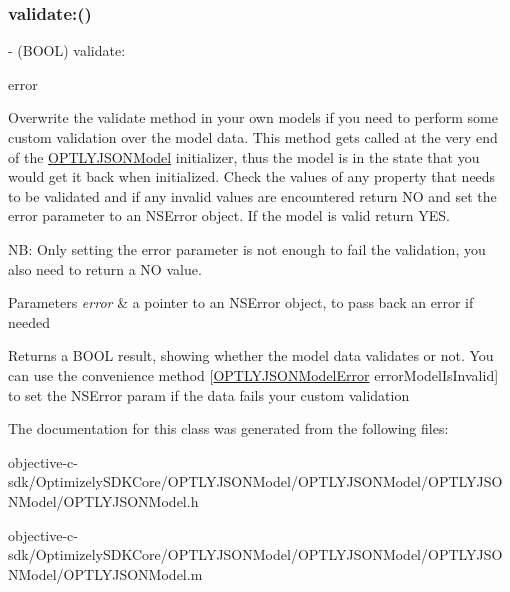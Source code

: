 \subsubsection{\texorpdfstring{validate\+:()}{validate:()}}
{\footnotesize\ttfamily -\/ (B\+O\+OL) validate\+: \begin{DoxyParamCaption}\item[{(N\+S\+Error $\ast$\+\_\+\+\_\+autoreleasing $\ast$)}]{error }\end{DoxyParamCaption}}

Overwrite the validate method in your own models if you need to perform some custom validation over the model data. This method gets called at the very end of the \mbox{\hyperlink{interface_o_p_t_l_y_j_s_o_n_model}{O\+P\+T\+L\+Y\+J\+S\+O\+N\+Model}} initializer, thus the model is in the state that you would get it back when initialized. Check the values of any property that needs to be validated and if any invalid values are encountered return NO and set the error parameter to an N\+S\+Error object. If the model is valid return Y\+ES.

NB\+: Only setting the error parameter is not enough to fail the validation, you also need to return a NO value.


\begin{DoxyParams}{Parameters}
{\em error} & a pointer to an N\+S\+Error object, to pass back an error if needed \\
\hline
\end{DoxyParams}
\begin{DoxyReturn}{Returns}
a B\+O\+OL result, showing whether the model data validates or not. You can use the convenience method \mbox{[}\mbox{\hyperlink{interface_o_p_t_l_y_j_s_o_n_model_error}{O\+P\+T\+L\+Y\+J\+S\+O\+N\+Model\+Error}} error\+Model\+Is\+Invalid\mbox{]} to set the N\+S\+Error param if the data fails your custom validation 
\end{DoxyReturn}


The documentation for this class was generated from the following files\+:\begin{DoxyCompactItemize}
\item 
objective-\/c-\/sdk/\+Optimizely\+S\+D\+K\+Core/\+O\+P\+T\+L\+Y\+J\+S\+O\+N\+Model/\+O\+P\+T\+L\+Y\+J\+S\+O\+N\+Model/\+O\+P\+T\+L\+Y\+J\+S\+O\+N\+Model/O\+P\+T\+L\+Y\+J\+S\+O\+N\+Model.\+h\item 
objective-\/c-\/sdk/\+Optimizely\+S\+D\+K\+Core/\+O\+P\+T\+L\+Y\+J\+S\+O\+N\+Model/\+O\+P\+T\+L\+Y\+J\+S\+O\+N\+Model/\+O\+P\+T\+L\+Y\+J\+S\+O\+N\+Model/O\+P\+T\+L\+Y\+J\+S\+O\+N\+Model.\+m\end{DoxyCompactItemize}
